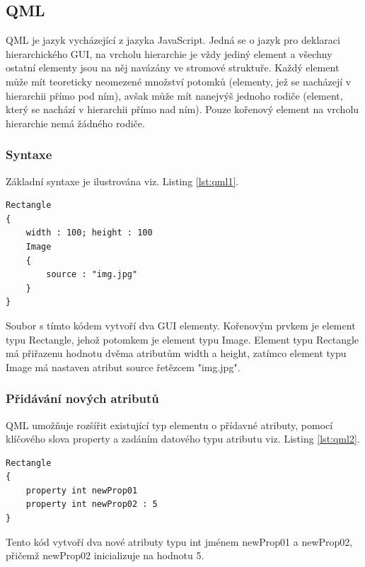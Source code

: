 \documentclass[report,11pt]{elsarticle}
\begin{document}
\subsection{QML}
QML je jazyk vycházející z jazyka JavaScript. Jedná se o jazyk pro deklaraci hierarchického GUI, na vrcholu hierarchie je vždy jediný element a všechny ostatní elementy jsou na něj navázány ve stromové struktuře. Každý element může mít teoreticky neomezené množství potomků (elementy, jež se nacházejí v hierarchii přímo pod ním), avšak může mít nanejvýš jednoho rodiče (element, který se nachází v hierarchii přímo nad ním). Pouze kořenový element na vrcholu hierarchie nemá žádného rodiče.


\subsubsection{Syntaxe}
Základní syntaxe je ilustrována viz. Listing \ref{lst:qml1}.
\begin{lstlisting}[frame=single,caption=Tvorba dvou jednoduchých elementů pomocí jazyka QML.,label=Tvorba dvou jednoduchých elementů pomocí jazyka QML.,label=lst:qml1]
Rectangle
{
	width : 100; height : 100
	Image
	{
		source : "img.jpg"
	}
}
\end{lstlisting}
Soubor s tímto kódem vytvoří dva GUI elementy. Kořenovým prvkem je element typu Rectangle, jehož potomkem je element typu Image. Element typu Rectangle má přiřazenu hodnotu dvěma atributům width a height, zatímco element typu Image má nastaven atribut source řetězcem "img.jpg".

\subsubsection{Přidávání nových atributů}
QML umožňuje rozšířit existující typ elementu o přídavné atributy, pomocí klíčového slova property a zadáním  datového typu atributu viz. Listing \ref{lst:qml2}.
\begin{lstlisting}[frame=single,caption=Ukázka deklarace dvou nových atributů.,label=lst:qml2]
Rectangle
{
	property int newProp01
	property int newProp02 : 5
}
\end{lstlisting}
Tento kód vytvoří dva nové atributy typu int jménem newProp01 a newProp02, přičemž newProp02 inicializuje na hodnotu 5.
\end{document}
